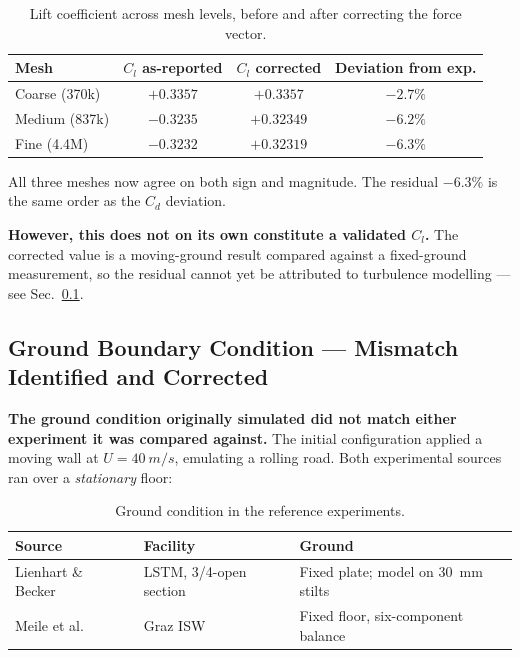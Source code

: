 \documentclass[12pt,a4paper]{article}
\begin{document}
\begin{table}[H]
\centering
\caption{Lift coefficient across mesh levels, before and after correcting the force vector.}
\begin{tabular}{lccc}
\toprule
Mesh & $C_l$ as-reported & $C_l$ corrected & Deviation from exp. \\
\midrule
Coarse (370k) & $+0.3357$ & $+0.3357$\footnotemark[2] & $-2.7\%$ \\
Medium (837k) & $-0.3235$ & $\mathbf{+0.32349}$ & $-6.2\%$ \\
Fine (4.4M)   & $-0.3232$ & $\mathbf{+0.32319}$ & $-6.3\%$ \\
\bottomrule
\end{tabular}
\end{table}


\noindent
All three meshes now agree on both sign and magnitude. The residual $-6.3\%$ is the same order as
the $C_d$ deviation.

\textbf{However, this does not on its own constitute a validated $C_l$.} The corrected value is a
moving-ground result compared against a fixed-ground measurement, so the residual cannot yet be
attributed to turbulence modelling — see Sec.~\ref{sec:ground_disc}.

\subsection{Ground Boundary Condition — Mismatch Identified and Corrected}
\label{sec:ground_disc}

\textbf{The ground condition originally simulated did not match either experiment it was compared
against.} The initial configuration applied a moving wall at $U = \SI{40}{m/s}$, emulating a rolling
road. Both experimental sources ran over a \emph{stationary} floor:

\begin{table}[H]
\centering
\caption{Ground condition in the reference experiments.}
\begin{tabular}{lll}
\toprule
Source & Facility & Ground \\
\midrule
Lienhart \& Becker~\cite{lienhart2003,ercoftac082} & LSTM, 3/4-open section & Fixed plate; model on
\SI{30}{mm} stilts \\
Meile et al.~\cite{meile2011,meile2016} & Graz ISW & Fixed floor, six-component balance \\
\bottomrule
\end{tabular}
\end{table}
\end{document}
